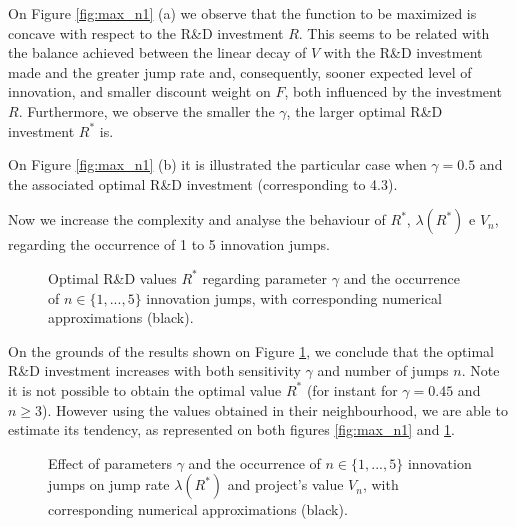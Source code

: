 On Figure \ref{fig:max_n1} (a) we observe that the function to be maximized is concave with respect to the R\&D investment $R$. This seems to be related with the balance achieved between the linear decay of $V$ with the R\&D investment made and the greater jump rate and, consequently, sooner expected level of innovation, and smaller discount weight on $F$, both influenced by the investment $R$. 
Furthermore, we observe the smaller the $\gamma$, the larger optimal R\&D investment $R^*$ is.



On Figure \ref{fig:max_n1} (b) it is illustrated the particular case when $\gamma=0.5$ and the associated optimal R\&D investment (corresponding to 4.3). %

Now we increase the complexity and analyse the behaviour of $R^*$, $\lambda(R^*)$ e $V_n$, regarding the occurrence of 1 to 5 innovation jumps.

\begin{figure}[!htb]
	\begin{subfigmatrix}{2}
	\end{subfigmatrix}
	\caption{Optimal R\&D values $R^*$ regarding parameter $\gamma$ and the occurrence of $n\in \{1,...,5\}$ innovation jumps, with corresponding numerical approximations (black). }
	\label{fig:max_nR}
\end{figure}

On the grounds of the results shown on Figure \ref{fig:max_nR}, we conclude that the optimal R\&D investment increases with both sensitivity $\gamma$ and number of jumps $n$. Note it is not possible to obtain the optimal value $R^*$ (for instant for $\gamma=0.45$ and $n\geq 3$). However using the values obtained in their neighbourhood, we are able to estimate its tendency, as represented on both figures \ref{fig:max_n1} and \ref{fig:max_nR}.

\begin{figure}[!htb]
	\begin{subfigmatrix}{2}
	\end{subfigmatrix}
	\caption{Effect of parameters $\gamma$ and the occurrence of $n\in \{1,...,5\}$ innovation jumps on jump rate $\lambda(R^*)$ and project's value $V_n$, with corresponding numerical approximations (black). }
	\label{fig:max_n}
\end{figure}


